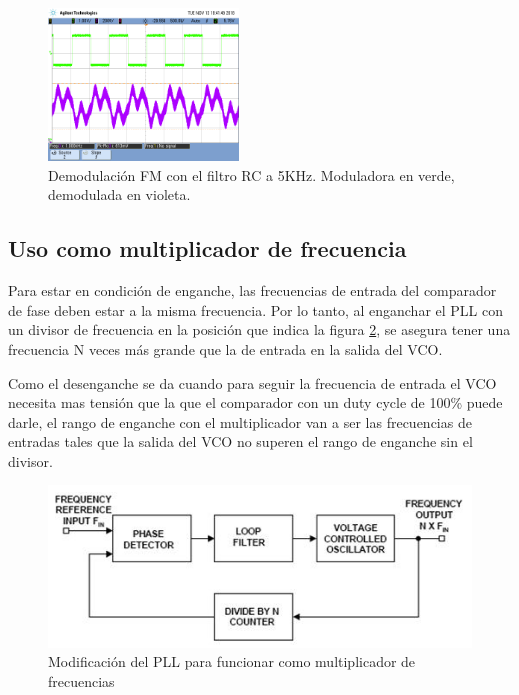 \documentclass[../../tc_tp6_main.tex]{subfiles}
\begin{document}
\begin{figure}
	\centering
	\includegraphics[width = 0.45\textwidth]{figures/scope_37.png}
	\caption{Demodulaci\'on FM con el filtro RC a 5KHz. Moduladora en verde, demodulada en violeta.}
	\label{fig:fm_rc_5k}
\end{figure}






\subsection{Uso como multiplicador de frecuencia}

Para estar en condici\'on de enganche, las frecuencias de entrada del comparador de fase deben estar a la misma frecuencia. Por lo tanto, al enganchar el PLL con un divisor de frecuencia en la posici\'on que indica la figura \ref{fig:multiplier_loop}, se asegura tener una frecuencia N veces m\'as grande que la de entrada en la salida del VCO.\par
Como el desenganche se da cuando para seguir la frecuencia de entrada el VCO necesita mas tensi\'on que la que el comparador con un duty cycle de 100\% puede darle, el rango de enganche con el multiplicador van a ser las frecuencias de entradas tales que la salida del VCO no superen el rango de enganche sin el divisor.


\begin{figure}[H]
	\centering
	\includegraphics[width = \textwidth]{figures/multiplier_loop.jpg}
	\caption{Modificaci\'on del PLL para funcionar como multiplicador de frecuencias}
	\label{fig:multiplier_loop}
\end{figure}
\end{document}
